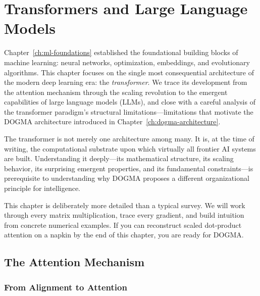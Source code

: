
\chapter{Transformers and Large Language Models}
\label{ch:transformers-llms}


\noindent
Chapter~\ref{ch:ml-foundations} established the foundational building blocks of machine learning: neural networks, optimization, embeddings, and evolutionary algorithms. This chapter focuses on the single most consequential architecture of the modern deep learning era: the \emph{transformer}. We trace its development from the attention mechanism through the scaling revolution to the emergent capabilities of large language models (LLMs), and close with a careful analysis of the transformer paradigm's structural limitations---limitations that motivate the DOGMA architecture introduced in Chapter~\ref{ch:dogma-architecture}.

The transformer is not merely one architecture among many. It is, at the time of writing, the computational substrate upon which virtually all frontier AI systems are built. Understanding it deeply---its mathematical structure, its scaling behavior, its surprising emergent properties, and its fundamental constraints---is prerequisite to understanding why DOGMA proposes a different organizational principle for intelligence.

This chapter is deliberately more detailed than a typical survey. We will work through every matrix multiplication, trace every gradient, and build intuition from concrete numerical examples. If you can reconstruct scaled dot-product attention on a napkin by the end of this chapter, you are ready for DOGMA.

\section{The Attention Mechanism}
\label{sec:attention}

\subsection{From Alignment to Attention}

